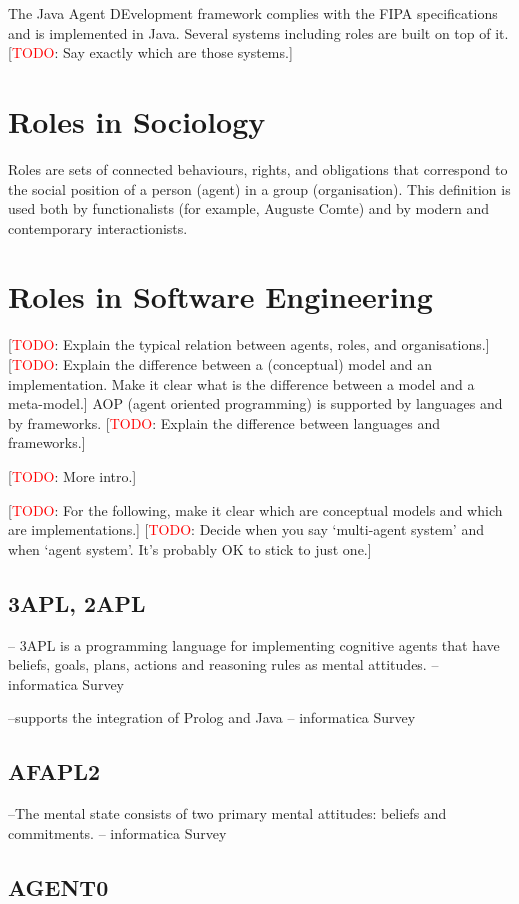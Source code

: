 \documentclass{article}
\newcommand{\todo}[1]{[\textcolor{red}{TODO}: #1]}
\begin{document}
The Java Agent DEvelopment framework complies with the FIPA
specifications and is implemented in Java. Several systems
including roles are built on top of it. \todo{Say exactly which
are those systems.}
\section{Roles in Sociology}

Roles are sets of connected behaviours, rights, and obligations
that correspond to the social position of a person (agent) in a
group (organisation). This definition is used both by functionalists
(for example, Auguste Comte) and by modern and contemporary
interactionists.
\section{Roles in Software Engineering}

\todo{Explain the typical relation between agents, roles, and
  organisations.}
\todo{Explain the difference between a (conceptual) model and an
  implementation. Make it clear what is the difference between a
  model and a meta-model.}
AOP (agent oriented programming) is supported by languages and by
frameworks.  \todo{Explain the difference between languages and
frameworks.}


\todo{More intro.}

\todo{For the following, make it clear which are conceptual models and
  which are implementations.}
\todo{Decide when you say `multi-agent system' and when `agent system'.
  It's probably OK to stick to just one.}

\subsection{3APL, 2APL}
-- 3APL is a programming language for implementing cognitive agents that have 
beliefs, goals, plans, actions and reasoning rules as mental 
attitudes. -- informatica Survey

--supports the integration of Prolog and Java -- informatica Survey
\subsection{AFAPL2}
--The mental state consists of two primary mental attitudes: beliefs and 
commitments. -- informatica Survey
\subsection{AGENT0}
\end{document}
